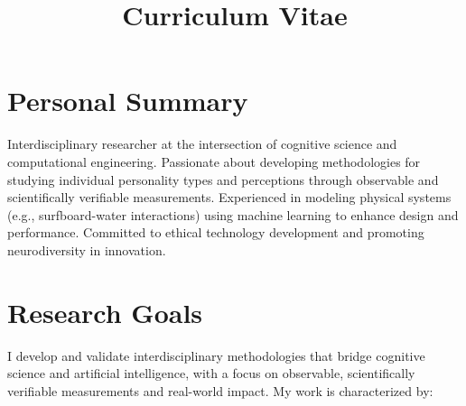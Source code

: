 \documentclass[11pt,a4paper,sans]{moderncv}
\title{Curriculum Vitae}
\begin{document}
\makecvtitle

\section{Personal Summary}
Interdisciplinary researcher at the intersection of cognitive science and computational engineering. Passionate about developing methodologies for studying individual personality types and perceptions through observable and scientifically verifiable measurements. Experienced in modeling physical systems (e.g., surfboard-water interactions) using machine learning to enhance design and performance. Committed to ethical technology development and promoting neurodiversity in innovation.

\section{Research Goals}
I develop and validate interdisciplinary methodologies that bridge cognitive science and artificial intelligence, with a focus on observable, scientifically verifiable measurements and real-world impact. My work is characterized by:
\end{document}
